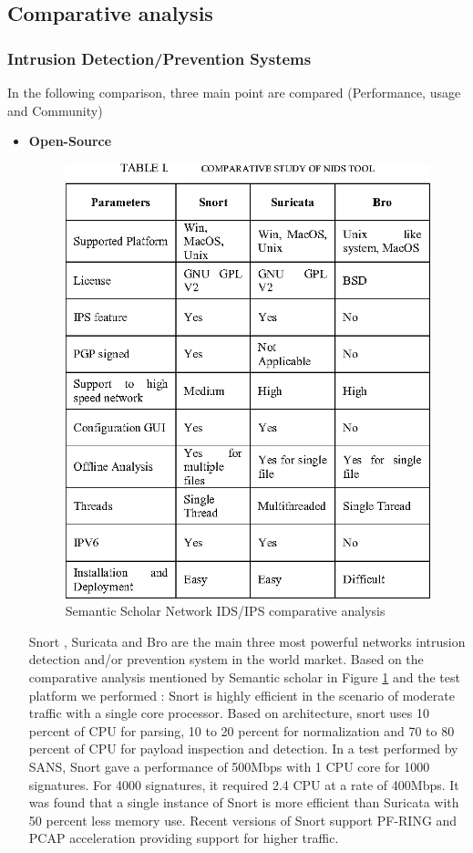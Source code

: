 \subsection{Comparative analysis }
\subsubsection{ Intrusion Detection/Prevention Systems}
In the following comparison, three main point are compared (Performance, usage and Community)
\begin{itemize}[label=]
\item\textbf{Open-Source}

\begin{figure}[!htpb] 
\begin{center}
\includegraphics[height=3.8 in]{images/ATHENANIDS.png}
\end{center}
\caption{ Semantic Scholar Network IDS/IPS comparative analysis }
\label{nids}
\end{figure}
Snort , Suricata and Bro are the main three most powerful networks intrusion detection and/or prevention system in the world market. Based on the comparative analysis mentioned by Semantic scholar in Figure \ref{nids} and the test platform we performed : Snort is highly efficient in the scenario of moderate traffic with a single core processor. Based on architecture, snort uses 10 percent of CPU for parsing, 10 to 20 percent for normalization and 70 to 80 percent of CPU for payload inspection and detection. In a test performed by SANS, Snort gave a performance of 500Mbps with 1 CPU core for 1000 signatures. For 4000 signatures, it required 2.4 CPU at a rate of 400Mbps. It was found that a single instance of Snort is more efficient than Suricata with 50 percent less memory use. Recent versions of Snort support PF-RING and PCAP acceleration providing support for higher traffic. 


\end{itemize}
